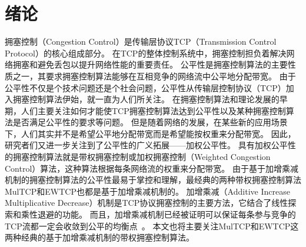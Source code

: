 \documentclass[winfonts]{njuthesis}
\begin{document}
\tableofcontents



\mainmatter

\chapter{绪论}\label{chapter:intro}

拥塞控制（Congestion Control）是传输层协议TCP（Transmission Control Protocol）的核心组成部分。
在TCP的整体控制系统中，拥塞控制担负着解决网络拥塞和避免丢包以提升网络性能的重要责任\cite{jacobson1988congestion}。
公平性是拥塞控制算法的主要性质之一，其要求拥塞控制算法能够在互相竞争的网络流中公平地分配带宽。
由于公平性不仅是个技术问题还是个社会问题，公平性从传输层控制协议（TCP）加入拥塞控制算法伊始，就一直为人们所关注。
在拥塞控制算法和理论发展的早期，人们主要关注如何才能使TCP拥塞控制算法达到公平性以及某种拥塞控制算法是否满足公平性的要求等问题\cite{chiu1989analysis}\cite{kelly1998rate}\cite{hasegawa1999fairness}。
但是随着网络的发展，在某些新的应用场景\cite{wischik2011design}\cite{Nathan2019wcubic}下，人们其实并不是希望公平地分配带宽而是希望能按权重来分配带宽。
因此，研究者们又进一步关注到了公平性的广义拓展——加权公平性。
具有加权公平性的拥塞控制算法就是带权拥塞控制或加权拥塞控制（Weighted Congestion Control）算法，这种算法根据每条网络流的权重来分配带宽。
由于基于加增乘减机制的拥塞控制算法的公平性最易于掌控和理解，最经典的两种带权拥塞控制算法MulTCP\cite{crowcroft1998differentiated}和EWTCP\cite{wischik2011design}也都是基于加增乘减机制的。
加增乘减（Additive Increase Multiplicative Decrease）机制是TCP协议拥塞控制的主要方法，它结合了线性探索和乘性退避的功能。
而且，加增乘减机制已经被证明可以保证每条参与竞争的TCP流都一定会收敛到公平的均衡点~\cite{chiu1989analysis}。
本文也将主要关注MulTCP和EWTCP这两种经典的基于加增乘减机制的带权拥塞控制算法。
\end{document}
